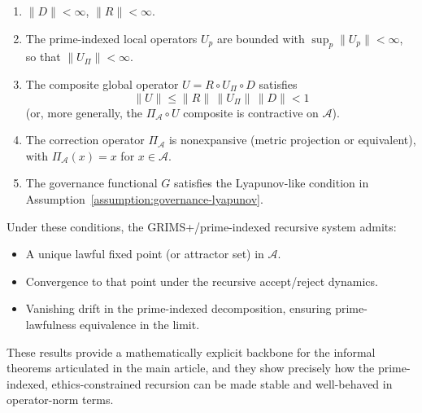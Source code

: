 \documentclass[11pt]{article}
\begin{document}
\begin{enumerate}
  \item \(\|D\| < \infty\), \(\|R\| < \infty\).
  \item The prime-indexed local operators \(U_p\) are bounded with \(\sup_p \|U_p\| < \infty\), so that \(\|U_{\Pi}\| < \infty\).
  \item The composite global operator \(U = R \circ U_{\Pi} \circ D\) satisfies
  \[
    \|U\| \le \|R\|\,\|U_{\Pi}\|\,\|D\| < 1
  \]
  (or, more generally, the \(\Pi_{\mathcal{A}} \circ U\) composite is contractive on \(\mathcal{A}\)).
  \item The correction operator \(\Pi_{\mathcal{A}}\) is nonexpansive (metric projection or equivalent), with \(\Pi_{\mathcal{A}}(x) = x\) for \(x \in \mathcal{A}\).
  \item The governance functional \(G\) satisfies the Lyapunov-like condition in Assumption~\ref{assumption:governance-lyapunov}.
\end{enumerate}

Under these conditions, the GRIMS+/prime-indexed recursive system admits:
\begin{itemize}
  \item A unique lawful fixed point (or attractor set) in \(\mathcal{A}\).
  \item Convergence to that point under the recursive accept/reject dynamics.
  \item Vanishing drift in the prime-indexed decomposition, ensuring prime-lawfulness equivalence in the limit.
\end{itemize}

These results provide a mathematically explicit backbone for the informal theorems articulated in the main article, and they show precisely how the prime-indexed, ethics-constrained recursion can be made stable and well-behaved in operator-norm terms.

\nocite{*}
  

\end{document}
